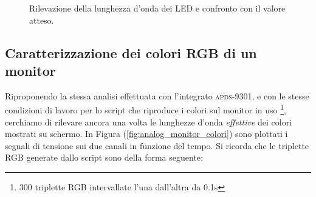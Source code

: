 \documentclass[10pt,letterpaper]{article}
\begin{document}
\begin{figure}
\centering
{}
{}

\caption{Rilevazione della lunghezza d'onda dei LED e confronto con il valore atteso.}
\label{LED_wavel}
\end{figure}

\subsection{Caratterizzazione dei colori RGB di un monitor}
Riproponendo la stessa analisi effettuata con l'integrato \textsc{apds-9301}, e con le stesse condizioni di lavoro per lo script che riproduce i colori sul monitor in uso \footnote{300 triplette RGB intervallate l'una dall'altra da 0.1s}, cerchiamo di rilevare ancora una volta le lunghezze d'onda \textit{effettive} dei colori mostrati su schermo. In Figura (\ref{fig:analog_monitor_colori}) sono plottati i segnali di tensione sui due canali in funzione del tempo. Si ricorda che le triplette RGB generate dallo script sono della forma seguente:
\end{document}
